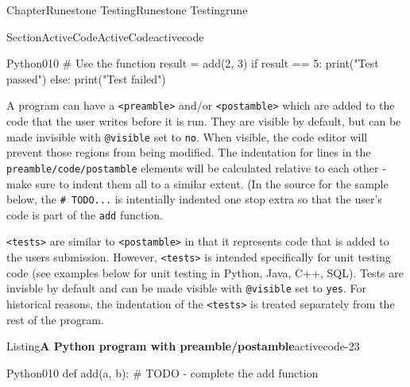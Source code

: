 \documentclass[oneside,10pt,]{book}
\newcommand{\mono}[1]{\texttt{#1}}
\numberwithin{equation}{section}
\begin{document}
\begin{chapterptx}{Chapter}{Runestone Testing}{}{Runestone Testing}{}{}{rune}
\begin{sectionptx}{Section}{ActiveCode}{}{ActiveCode}{}{}{activecode}
\begin{program}{Python}{0}{1}{0}
# Use the function
result = add(2, 3)
if result == 5:
    print("Test passed")
else:
    print("Test failed")
\end{program}
A program can have a \mono{<preamble>} and\slash{}or \mono{<postamble>} which are added to the code that the user writes before it is run. They are visible by default, but can be made invisible with \mono{@visible} set to \mono{\textquotedbl{}no\textquotedbl{}}. When visible, the code editor will prevent those regions from being modified. The indentation for lines in the \mono{preamble/code/postamble} elements will be calculated relative to each other - make sure to indent them all to a similar extent. (In the source for the sample below, the \mono{\# TODO...} is intentially indented one stop extra so that the user's code is part of the \mono{add} function.%
\par
\mono{<tests>} are similar to \mono{<postamble>} in that it represents code that is added to the users submission. However, \mono{<tests>} is intended specifically for unit testing code (see examples below for unit testing in Python, Java, C++, SQL). Tests are invisble by default and can be made visible with \mono{@visible} set to \mono{\textquotedbl{}yes\textquotedbl{}}. For historical reasons, the indentation of the \mono{<tests>} is treated separately from the rest of the program.%
\begin{listingptx}{Listing}{\textbf{A Python program with preamble\slash{}postamble}}{activecode-23}{}%
\begin{program}{Python}{0}{1}{0}
def add(a, b):
    # TODO - complete the add function


\end{program}
\end{listingptx}
\end{sectionptx}
\end{chapterptx}
\end{document}
